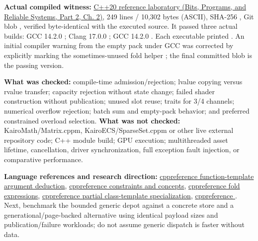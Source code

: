 \textbf{Actual compiled witness:} \href{../01-Bits-Programs-and-Reliable-Systems-P02/main.pdf\#nameddest=source-file-a5db53514d74ae247b4ac42f}{C++20 reference laboratory (Bits, Programs, and Reliable Systems, Part 2, Ch. 2)}, 249 lines / 10,302 bytes (ASCII), SHA-256 , Git blob , verified byte-identical with the executed source. It passed three actual builds: GCC 14.2.0 ; Clang 17.0.0 ; GCC 14.2.0 . Each executable printed . An initial compiler warning from the empty pack under GCC  was corrected by explicitly marking the sometimes-unused fold helper ; the final committed blob is the passing version.

\textbf{What was checked:} compile-time admission/rejection; lvalue copying versus rvalue transfer; capacity rejection without state change; failed shader construction without publication; unused slot reuse; traits for 3/4 channels; numerical overflow rejection; batch sum and empty-pack behavior; and preferred constrained overload selection. \textbf{What was not checked:} KairoMath/Matrix.cppm, KairoECS/SparseSet.cppm or other live external repository code; C++ module build; GPU execution; multithreaded asset lifetime, cancellation, driver synchronization, full exception fault injection, or comparative performance.

\textbf{Language references and research direction:} \href{https://en.cppreference.com/w/cpp/language/template_argument_deduction}{cppreference function-template argument deduction}, \href{https://en.cppreference.com/w/cpp/language/constraints}{cppreference constraints and concepts}, \href{https://en.cppreference.com/w/cpp/language/fold}{cppreference fold expressions}, \href{https://en.cppreference.com/w/cpp/language/partial_specialization}{cppreference partial class-template specialization}, \href{https://en.cppreference.com/w/cpp/utility/forward}{cppreference }. Next, benchmark the bounded generic depot against a concrete store and a generational/page-backed alternative using identical payload sizes and publication/failure workloads; do not assume generic dispatch is faster without data.

